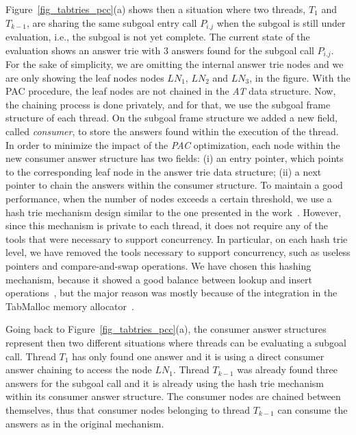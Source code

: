 \documentclass{llncs}
\begin{document}
Figure~\ref{fig_tabtries_pcc}(a) shows then a situation where two
threads, $T_1$ and $T_{k-1}$, are sharing the same subgoal entry call
$P_{i.j}$ when the subgoal is still under evaluation, i.e., the
subgoal is not yet complete. The current state of the evaluation shows
an answer trie with $3$ answers found for the subgoal call
$P_{i.j}$. For the sake of simplicity, we are omitting the internal
answer trie nodes and we are only showing the leaf nodes nodes $LN_1$,
$LN_2$ and $LN_3$, in the figure. With the PAC procedure, the leaf
nodes are not chained in the \emph{AT} data structure. Now, the
chaining process is done privately, and for that, we use the subgoal
frame structure of each thread. On the subgoal frame structure we
added a new field, called \emph{consumer}, to store the answers found
within the execution of the thread. In order to minimize the impact of
the \emph{PAC} optimization, each node within the new consumer answer
structure has two fields: (i) an entry pointer, which points to the
corresponding leaf node in the answer trie data structure; (ii) a next
pointer to chain the answers within the consumer structure. To
maintain a good performance, when the number of nodes exceeds a
certain threshold, we use a hash trie mechanism design similar to the
one presented in the work~\cite{Areias-ijpp15}. However, since this
mechanism is private to each thread, it does not require any of the
tools that were necessary to support concurrency. In particular, on
each hash trie level, we have removed the tools necessary to support
concurrency, such as useless pointers and compare-and-swap
operations. We have chosen this hashing mechanism, because it showed a
good balance between lookup and insert
operations~\cite{Areias-ijpp15}, but the major reason was mostly
because of the integration in the TabMalloc memory
allocator~\cite{Areias-12b}.

Going back to Figure~\ref{fig_tabtries_pcc}(a), the consumer answer
structures represent then two different situations where threads can
be evaluating a subgoal call. Thread $T_1$ has only found one answer
and it is using a direct consumer answer chaining to access the node
$LN_1$. Thread $T_{k-1}$ was already found three answers for the
subgoal call and it is already using the hash trie mechanism within
its consumer answer structure. The consumer nodes are chained between
themselves, thus that consumer nodes belonging to thread $T_{k-1}$ can
consume the answers as in the original mechanism.
\end{document}
